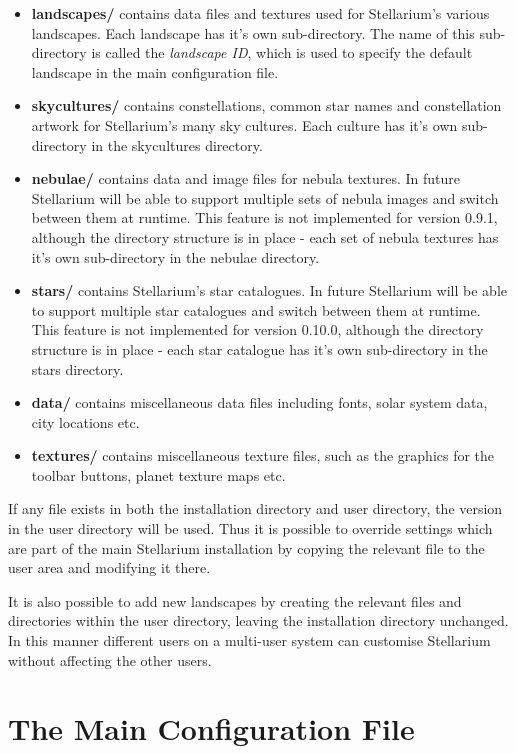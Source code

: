 \begin{itemize}
\item
  \textbf{landscapes/} contains data files and textures used for
  Stellarium's various landscapes. Each landscape has it's own
  sub-directory. The name of this sub-directory is called the
  \emph{landscape ID}, which is used to specify the default landscape in
  the main configuration file.
\item
  \textbf{skycultures/} contains constellations, common star names and
  constellation artwork for Stellarium's many sky cultures. Each culture
  has it's own sub-directory in the skycultures directory.
\item
  \textbf{nebulae/} contains data and image files for nebula textures.
  In future Stellarium will be able to support multiple sets of nebula
  images and switch between them at runtime. This feature is not
  implemented for version 0.9.1, although the directory structure is in
  place - each set of nebula textures has it's own sub-directory in the
  nebulae directory.
\item
  \textbf{stars/} contains Stellarium's star catalogues. In future
  Stellarium will be able to support multiple star catalogues and switch
  between them at runtime. This feature is not implemented for version
  0.10.0, although the directory structure is in place - each star
  catalogue has it's own sub-directory in the stars directory.
\item
  \textbf{data/} contains miscellaneous data files including fonts,
  solar system data, city locations etc.
\item
  \textbf{textures/} contains miscellaneous texture files, such as the
  graphics for the toolbar buttons, planet texture maps etc.
\end{itemize}

If any file exists in both the installation directory and user
directory, the version in the user directory will be used. Thus it is
possible to override settings which are part of the main Stellarium
installation by copying the relevant file to the user area and modifying
it there.

It is also possible to add new landscapes by creating the relevant files
and directories within the user directory, leaving the installation
directory unchanged. In this manner different users on a multi-user
system can customise Stellarium without affecting the other users.

\section{The Main Configuration
File}\label{the-main-configuration-file}

